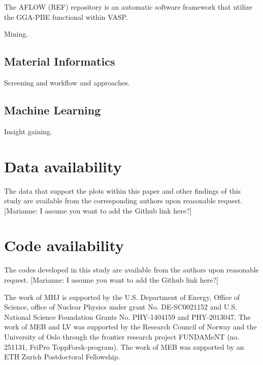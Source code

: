 \documentclass[superscriptaddress,unsortedaddress,
 amsmath,amssymb,
 aps,
]{revtex4-2}
\begin{document}
The AFLOW (REF) repository is an automatic software framework that utilize the GGA-PBE functional within VASP. 



Mining.  

\subsection*{Material Informatics} %
Screening and workflow and approaches.  

\subsection*{Machine Learning} %
Insight gaining. 

\section*{Data availability} 
The data that support the plots within this paper and other findings of this study are
available from the corresponding authors upon reasonable request. [Marianne: I assume you want to add the Github link here?] 

\section*{Code availability} 
The codes developed in this study are available from the authors upon reasonable
request. [Marianne: I assume you want to add the Github link here?] 


\begin{acknowledgments}

The work of MHJ is supported by the U.S. Department of Energy,
Office of Science, office of Nuclear Physics under grant
No. DE-SC0021152 and U.S. National Science Foundation Grants
No. PHY-1404159 and PHY-2013047. 
The work of MEB and LV was supported by the Research Council of Norway and the University of Oslo through the frontier research project FUNDAMeNT (no. 251131, FriPro ToppForsk-program). 
The work of MEB was supported by an ETH Zurich Postdoctoral Fellowship. 

\end{acknowledgments}
\end{document}
